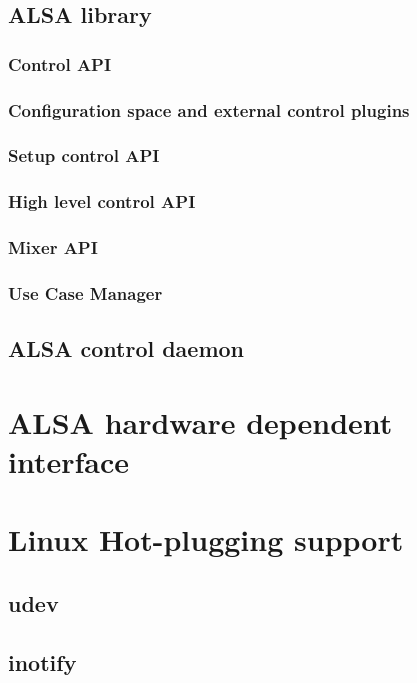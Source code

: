 \documentclass[onecolumn]{article}
\begin{document}
\subsection{ALSA library}

\subsubsection{Control API}

\subsubsection{Configuration space and external control plugins}

\subsubsection{Setup control API}

\subsubsection{High level control API}

\subsubsection{Mixer API}

\subsubsection{Use Case Manager}

\subsection{ALSA control daemon}

\section{ALSA hardware dependent interface}

\section{Linux Hot-plugging support}

\subsection{udev}

\subsection{inotify}
\end{document}
